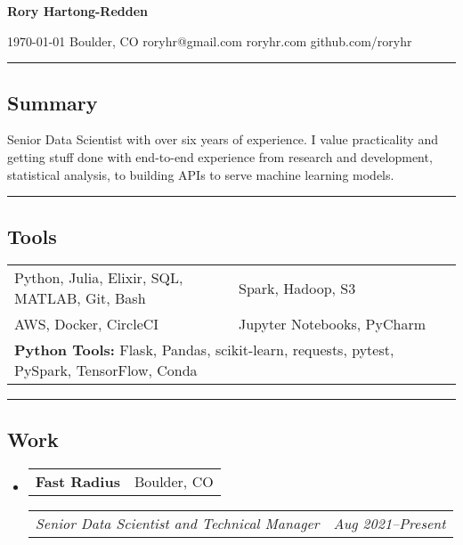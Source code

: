 \documentclass[10pt,letterpaper]{article}
\makeatletter
\newenvironment{indentsection}[1]
{\begin{list}{}%
	{\setlength{\leftmargin}{#1}}
	\item[]%
}
{\end{list}}
\newcommand{\headerrow}[2]{
\begin{tabular*}{\linewidth}{l@{\extracolsep{\fill}}r}
		#1 &
		#2 \\
	\end{tabular*}
}
\newcommand{\jobitem}[4]{\item \headerrow{\textbf{#1}}{#2}
\headerrow{\emph{#3}}{\emph{#4}}}
\makeatother
\begin{document}
{\raggedright \LARGE \bf Rory Hartong-Redden}

{\raggedleft 
\today \/ \textbar
\/ Boulder, CO \textbar
\/ roryhr@gmail.com \textbar
\/ roryhr.com \textbar\/   
github.com/roryhr\\
}
\hrule

\subsection*{Summary}
\begin{centering}  
Senior Data Scientist with over six years of experience. I value practicality and getting stuff done with end-to-end experience from research and development, statistical analysis, to building APIs to serve machine learning models.\\
\end{centering}
\hrule

\subsection*{Tools}
\begin{indentsection}{\parindent}
\begin{tabular}{p{0.5\linewidth}   p{0.5\linewidth}} 
	Python, Julia, Elixir, SQL, MATLAB, Git, Bash
	& Spark, Hadoop, S3 \\

	AWS, Docker, CircleCI 
	& Jupyter Notebooks, PyCharm\\ 
	
	\multicolumn{2}{l}{
		\textbf{Python Tools:} Flask, Pandas, scikit-learn, requests, pytest, PySpark, TensorFlow, Conda
		}
\end{tabular}
\end{indentsection}

\hrule
\subsection*{Work}

\begin{itemize}
	\jobitem{Fast Radius}{Boulder, CO}
		     {Senior Data Scientist and Technical Manager}{Aug 2021--Present}
\end{itemize}
\end{document}
